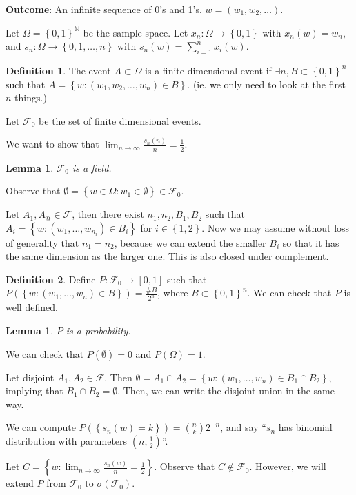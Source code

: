 \documentclass[11pt]{article}
\newtheorem{lemma}[thm]{Lemma}
\theoremstyle{definition}
\newtheorem{defn}{Definition}[section]
\newcommand{\set}[1]{\left\{ #1 \right\}}
\newcommand{\NN}{\mathbb{N}}
\newcommand{\m}[1]{\mathcal{#1}}
\begin{document}
\textbf{Outcome}: An infinite sequence of 0's and 1's. $w = (w_1,w_2,\dots)$.

Let $\Omega = \set{0,1}^\NN$ be the sample space. 
Let $x_n:\Omega\to\set{0,1}$ with $x_n(w) = w_n$, and $s_n:\Omega\to\set{0,1,\dots,n}$ with $s_n(w)
= \sum_{i=1}^n x_i(w)$. 

\begin{defn}
    The event $A\subset\Omega$ is a finite dimensional event if $\exists n, B\subset\set{0,1}^n$
    such that $A = \set{w:(w_1,w_2,\dots,w_n)\in B}$.  
    (ie. we only need to look at the first $n$ things.)

    Let $\m{F}_0$ be the set of finite dimensional events.
\end{defn}

We want to show that $\lim_{n\to\infty} \frac{s_n(n)}{n} = \frac12$.

\begin{lemma}
    $\m{F}_0$ is a field.
\end{lemma}
\proof
Observe that $\emptyset = \set{w\in\Omega:w_1\in\emptyset}\in\m{F}_0$.

Let $A_1, A_@ \in \m{F}$, then there exist $n_1, n_2, B_1, B_2$ such that $A_i =
\set{w:(w_1,\dots,w_{n_i})\in B_i}$ for $i\in\set{1,2}$. Now we may assume without loss of
generality that $n_1=n_2$, because we can extend the smaller $B_i$ so that it has the same
dimension as the larger one. This is also closed under complement. 
\qedhere

\begin{defn}
    Define $P:\m{F}_0\to[0,1]$ such that $P(\set{w:(w_1,\dots,w_n)\in B})=\frac{\#B}{2^n}$,
    where $B\subset\set{0,1}^n$. We can check that $P$ is well defined.
\end{defn}

\begin{lemma}
    $P$ is a probability.
\end{lemma}
\proof
We can check that $P(\emptyset) = 0$ and $P(\Omega) = 1$.

Let disjoint $A_1, A_2 \in \m{F}$. Then $\emptyset = A_1\cap A_2 =
\set{w:(w_1,\dots,w_n)\in B_1\cap B_2}$, implying that $B_1\cap B_2 = \emptyset$. Then, we
can write the disjoint union in the same way. 
\qedhere

We can compute $P(\set{s_n(w)=k}) = \binom{n}{k} 2^{-n}$, and say ``$s_n$ has binomial
distribution with parameters $(n,\frac12)$''.

Let $C = \set{w:\lim_{n\to\infty} \frac{s_n(w)}{n} = \frac12}$. Observe that
$C\notin\m{F}_0$. However, we will extend $P$ from $\m{F}_0$ to $\sigma(\m{F}_0)$.
\end{document}
